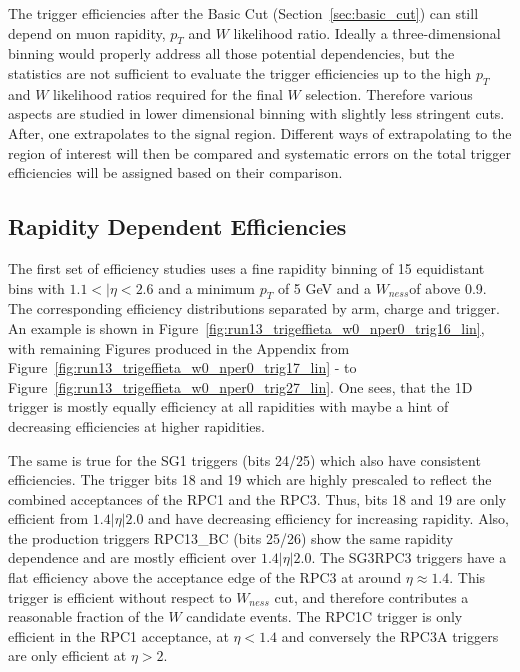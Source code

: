 The trigger efficiencies after the Basic Cut (Section~\ref{sec:basic_cut}) can
still depend on muon rapidity, $p_T$ and $W$ likelihood ratio.
Ideally a three-dimensional binning would properly address all those potential
dependencies, but the statistics are not sufficient to evaluate the trigger
efficiencies up to the high $p_T$ and $W$ likelihood ratios
required for the final $W$ selection. Therefore various aspects are studied in
lower dimensional binning with slightly less stringent cuts. After, one
extrapolates to the signal region. Different ways of extrapolating to the region
of interest will then be compared and systematic errors on the total trigger
efficiencies will be assigned based on their comparison. 

\subsection{Rapidity Dependent Efficiencies}

The first set of efficiency studies uses a fine rapidity binning of 15
equidistant bins with $1.1<\vert\eta<2.6$ and a minimum $p_T$ of 5
GeV and a $W_{ness}$of above 0.9.  The corresponding efficiency
distributions separated by arm, charge and trigger. An example is shown in
Figure~\ref{fig:run13_trigeffieta_w0_nper0_trig16_lin}, with remaining Figures
produced in the Appendix from
Figure~\ref{fig:run13_trigeffieta_w0_nper0_trig17_lin} - to
Figure~\ref{fig:run13_trigeffieta_w0_nper0_trig27_lin}. One sees, that the 1D
trigger is mostly equally efficiency at all rapidities with maybe a hint of
decreasing efficiencies at higher rapidities. 

The same is true for the SG1 triggers (bits 24/25) which also have consistent
efficiencies.  The trigger bits 18 and 19 which are highly prescaled to reflect
the combined acceptances of the RPC1 and the RPC3. Thus, bits 18 and 19 are only
efficient from $1.4 \vert\eta\vert 2.0$ and have decreasing efficiency for
increasing rapidity. Also, the production triggers RPC13\_BC (bits 25/26) show
the same rapidity dependence and are mostly efficient over $1.4 \vert\eta\vert
2.0$.  The SG3RPC3 triggers have a flat efficiency above the acceptance edge of
the RPC3 at around $\eta\approx1.4$. This trigger is efficient without respect
to $W_{ness}$ cut, and therefore contributes a reasonable fraction of the $W$
candidate events.  The RPC1C trigger is only efficient in the RPC1 acceptance,
at $\eta < 1.4$ and conversely the RPC3A triggers are only efficient at $\eta >
2$.

